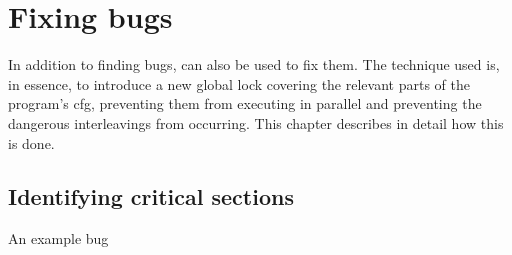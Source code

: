 \chapter{Fixing bugs}
\label{sect:fix_global_lock}

\newcommand{\one}{~\hspace{-1.2pt}1\hspace{3.0pt}~}

In addition to finding bugs, {\technique} can also be used to fix
them.  The technique used is, in essence, to introduce a new global
lock covering the relevant parts of the program's \gls{cfg},
preventing them from executing in parallel and preventing the
dangerous interleavings from occurring.  This chapter describes in
detail how this is done.

\section{Identifying critical sections}
\label{sect:fix:identify}

\begin{sanefig}
  \hspace{-5mm}
  \hspace{-10mm}
  \caption{An example bug}
  \label{fig:fix_bug:complex_local}
\end{sanefig}

